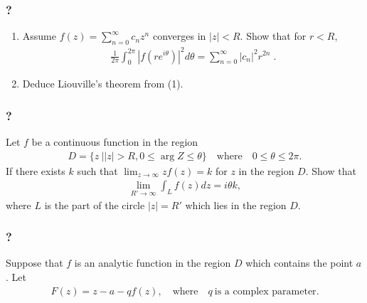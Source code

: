 \hypertarget{section-107}{%
\subsubsection{?}\label{section-107}}

\begin{enumerate}
\def\labelenumi{(\arabic{enumi})}
\item
  Assume \(\displaystyle f(z) = \sum_{n=0}^\infty c_n z^n\) converges in
  \(|z| < R\). Show that for \(r <R\),
  \begin{align*}\frac{1}{2 \pi} \int_0^{2 \pi} |f(r e^{i \theta})|^2 d \theta =
  \sum_{n=0}^\infty |c_n|^2 r^{2n} \; .\end{align*}
\item
  Deduce Liouville's theorem from (1).
\end{enumerate}

\hypertarget{section-108}{%
\subsubsection{?}\label{section-108}}

Let \(f\) be a continuous function in the region
\begin{align*}D=\{z\ |  |z|>R, 0\leq \arg Z\leq \theta\}\quad\text{where}\quad
0\leq \theta \leq 2\pi.\end{align*}
If there exists \(k\) such that
\(\displaystyle{\lim_{z\to\infty} zf(z)=k}\) for \(z\) in the region
\(D\). Show that
\begin{align*}\lim_{R'\to\infty} \int_{L} f(z) dz=i\theta k,\end{align*}
where \(L\) is the part of the circle \(|z|=R'\) which lies in the
region \(D\).

\hypertarget{section-109}{%
\subsubsection{?}\label{section-109}}

Suppose that \(f\) is an analytic function in the region \(D\) which
contains the point \(a\). Let
\begin{align*}F(z)= z-a-qf(z),\quad \text{where}\quad q \ \text{is a complex
parameter}.\end{align*}

